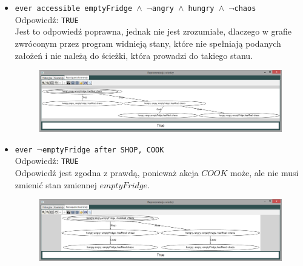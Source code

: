 \documentclass{article}
\begin{document}
\begin{itemize}
\begin{figure}[H]
    \end{figure}
    \item {\large\texttt{ever accessible emptyFridge $\wedge$ $\neg$angry $\wedge$ hungry $\wedge$ $\neg$chaos }}\\
    Odpowiedź: \texttt{TRUE}\\
    Jest to odpowiedź poprawna, jednak nie jest zrozumiałe, dlaczego w grafie zwróconym przez program widnieją stany, które nie spełniają podanych założeń i nie należą do ścieżki, która prowadzi do takiego stanu.
    \begin{figure}[H]
    \centering
    \includegraphics[scale=0.35]{test2_3}
    \end{figure}
    \item {\large\texttt{ever $\neg$emptyFridge after SHOP, COOK}}\\
    Odpowiedź: \texttt{TRUE}\\
    Odpowiedź jest zgodna z prawdą, ponieważ akcja $COOK$ może, ale nie musi zmienić stan zmiennej $emptyFridge$.
    \begin{figure}[H]
    \centering
    \includegraphics[scale=0.35]{test2_4}
    \end{figure}
\end{itemize}

\newpage
\end{document}
